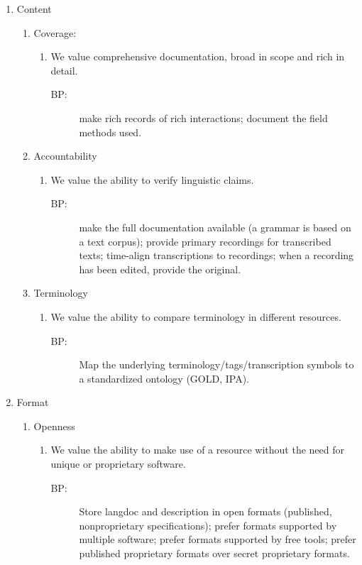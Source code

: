 \documentclass{article}
\begin{document}
\begin{enumerate}
  \item Content
  \begin{enumerate}
    \item Coverage:
    \begin{enumerate}
      \item We value comprehensive documentation, broad in scope and rich in detail.
      \begin{description}
      \item[BP:] make rich records of rich interactions; document the field methods used.
      \end{description}
    \end{enumerate}
    \item Accountability
    \begin{enumerate}
      \item We value the ability to verify linguistic claims.
      \begin{description}
        \item[BP:] make the full documentation available (a grammar is based on a text corpus); provide primary recordings for transcribed texts; time-align transcriptions to recordings; when a recording has been edited, provide the original.
      \end{description}
    \end{enumerate}
    \item Terminology
    \begin{enumerate}
      \item We value the ability to compare terminology in different resources.
      \begin{description}
        \item[BP:] Map the underlying terminology/tags/transcription symbols to a standardized ontology (GOLD, IPA).
      \end{description}
    \end{enumerate}
  \end{enumerate}
  \item Format
  \begin{enumerate}
    \item Openness
    \begin{enumerate}
      \item We value the ability to make use of a resource without the need for unique or proprietary software.
      \begin{description}
        \item[BP:] Store langdoc and description in open formats (published, nonproprietary specifications); prefer formats supported by multiple software; prefer formats supported by free tools; prefer published proprietary formats over secret proprietary formats.

\end{description}
\end{enumerate}
\end{enumerate}
\end{enumerate}
\end{document}

